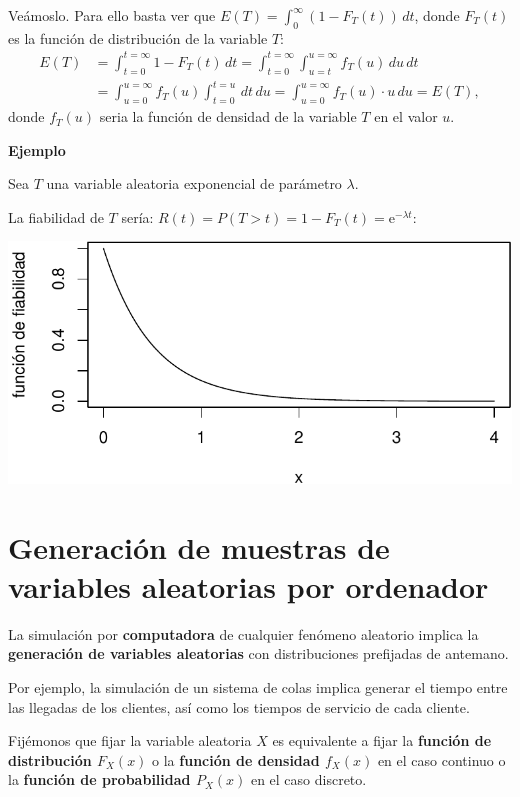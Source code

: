 \documentclass[
  letterpaper,
  DIV=11,
  numbers=noendperiod]{scrreprt}
\begin{document}
Veámoslo. Para ello basta ver que
\(E(T)=\int_0^\infty (1-F_T(t))\, dt\), donde \(F_T(t)\) es la función
de distribución de la variable \(T\): \[
\begin{array}{rl}
E(T) & =\displaystyle\int_{t=0}^{t=\infty} 1-F_T(t)\, dt=\int_{t=0}^{t=\infty}\int_{u=t}^{u=\infty} f_T(u)\,du\,dt \\[1ex] & =\displaystyle\int_{u=0}^{u=\infty} f_T(u)\int_{t=0}^{t=u} \, dt\, du =\int_{u=0}^{u=\infty} f_T(u)\cdot u\, du = E(T),
\end{array}
\] donde \(f_T(u)\) seria la función de densidad de la variable \(T\) en
el valor \(u\).

\textbf{Ejemplo}

Sea \(T\) una variable aleatoria exponencial de parámetro \(\lambda\).

La fiabilidad de \(T\) sería:
\(R(t)=P(T>t)=1-F_T(t)=\mathrm{e}^{-\lambda t}\):

\includegraphics{4_files/figure-pdf/unnamed-chunk-5-1.pdf}

\hypertarget{generaciuxf3n-de-muestras-de-variables-aleatorias-por-ordenador}{%
\section{Generación de muestras de variables aleatorias por
ordenador}\label{generaciuxf3n-de-muestras-de-variables-aleatorias-por-ordenador}}

La simulación por \textbf{computadora} de cualquier fenómeno aleatorio
implica la \textbf{generación de variables aleatorias} con
distribuciones prefijadas de antemano.

Por ejemplo, la simulación de un sistema de colas implica generar el
tiempo entre las llegadas de los clientes, así como los tiempos de
servicio de cada cliente.

Fijémonos que fijar la variable aleatoria \(X\) es equivalente a fijar
la \textbf{función de distribución \(F_X(x)\)} o la \textbf{función de
densidad \(f_X(x)\)} en el caso continuo o la \textbf{función de
probabilidad \(P_X(x)\)} en el caso discreto.
\end{document}
